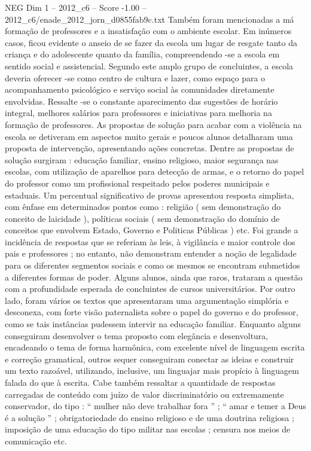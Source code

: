 \begin{textsample}{NEG Dim 1 – 2012\_c6 – Score -1.00 – 2012\_c6/enade\_2012\_jorn\_d0855fab9c.txt}
Também foram mencionadas a má formação de professores e a insatisfação com o ambiente escolar.
Em inúmeros casos, ficou evidente o anseio de se fazer da escola um lugar de resgate tanto da criança e do adolescente quanto da família, compreendendo -se a escola em sentido social e assistencial.
Segundo este amplo grupo de concluintes, a escola deveria oferecer -se como centro de cultura e lazer, como espaço para o acompanhamento psicológico e serviço social às comunidades diretamente envolvidas.
Ressalte -se o constante aparecimento das sugestões de horário integral, melhores salários para professores e iniciativas para melhoria na formação de professores.
As propostas de solução para acabar com a violência na escola se detiveram em aspectos muito gerais e poucos alunos detalharam uma proposta de intervenção, apresentando ações concretas.
Dentre as propostas de solução surgiram : educação familiar, ensino religioso, maior segurança nas escolas, com utilização de aparelhos para detecção de armas, e o retorno do papel do professor como um profissional respeitado pelos poderes municipais e estaduais.
Um percentual significativo de provas apresentou resposta simplista, com ênfase em determinados pontos como : religião ( sem demonstração do conceito de laicidade ), políticas sociais ( sem demonstração do domínio de conceitos que envolvem Estado, Governo e Politicas Públicas ) etc.
Foi grande a incidência de respostas que se referiam às leis, à vigilância e maior controle dos pais e professores ; no entanto, não demonstram entender a noção de legalidade para os diferentes segmentos sociais e como os mesmos se encontram submetidos a diferentes formas de poder.
Alguns alunos, ainda que raros, trataram a questão com a profundidade esperada de concluintes de cursos universitários.
Por outro lado, foram vários os textos que apresentaram uma argumentação simplória e desconexa, com forte visão paternalista sobre o papel do governo e do professor, como se tais instâncias pudessem intervir na educação familiar.
Enquanto alguns conseguiram desenvolver o tema proposto com elegância e desenvoltura, encadeando o tema de forma harmônica, com excelente nível de linguagem escrita e correção gramatical, outros sequer conseguiram conectar as ideias e construir um texto razoável, utilizando, inclusive, um linguajar mais propício à linguagem falada do que à escrita.
Cabe também ressaltar a quantidade de respostas carregadas de conteúdo com juízo de valor discriminatório ou extremamente conservador, do tipo : “ mulher não deve trabalhar fora ” ; “ amar e temer a Deus é a solução ” ; obrigatoriedade do ensino religioso e de uma doutrina religiosa ; imposição de uma educação do tipo militar nas escolas ; censura nos meios de comunicação etc.

\end{textsample}
